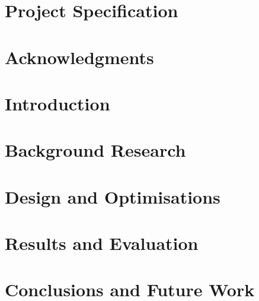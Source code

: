 \documentclass[]{UCD_CS_FYP_Report}
\begin{document}
\maketitle


\chapter*{Project Specification}



\begin{abstract}
	
\end{abstract}
\newpage


\chapter*{Acknowledgments}



\tableofcontents{}\newpage
\newpage


\chapter{Introduction}



\chapter{Background Research}


\chapter{Design and Optimisations}


\chapter{Results and Evaluation}


\chapter{Conclusions and Future Work}


\newpage


\label{endpage}
\end{document}
